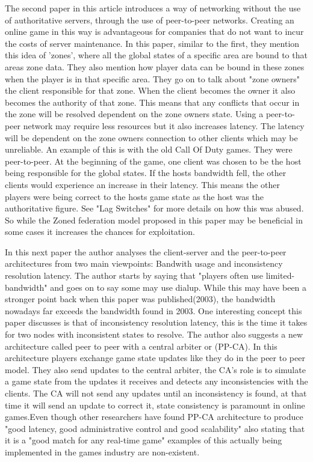 \documentclass{scrartcl}
\begin{document}
The second paper in this article introduces a way of networking without the use of authoritative servers, through the use of peer-to-peer networks\cite{iimura2004zoned}. Creating an online game in this way is advantageous for companies that do not want to incur the costs of server maintenance.  In this paper, similar to the first, they mention this idea of  'zones', where all the global states of a specific area are bound to that areas zone data. They also mention how player data can be bound in these zones when the player is in that specific area. They go on to talk about "zone owners" the client responsible for that zone. When the client becomes the owner it also becomes the authority of that zone. This means that any conflicts that occur in the zone will be resolved dependent on the zone owners state. Using a peer-to-peer network may require less resources but it also increases latency. The latency will be dependent on the zone owners connection to other clients which may be unreliable. An example of this is with the old Call Of Duty games. They were peer-to-peer. At the beginning of the game, one client was chosen to be the host being responsible for the global states. If the hosts bandwidth fell, the other clients would experience an increase in their latency. This means the other players were being correct to the hosts game state as the host was the authoritative figure. See "Lag Switches"\cite {LagSwitch} for more details on how this was abused. So while the Zoned federation model proposed in this paper may be beneficial in some cases it increases the chances for exploitation.

In this next paper\cite {pellegrino2003bandwidth} the author analyses the client-server and the peer-to-peer architectures from two main viewpoints: Bandwith usage and inconsistency  resolution latency. The author starts by saying that "players often use limited-bandwidth" and goes on to say some may use dialup. While this may have been a stronger point back when this paper was published(2003), the bandwidth nowadays far exceeds the bandwidth found in 2003. One interesting concept this paper discusses is that of inconsistency resolution latency, this is the time it takes for two nodes with inconsistent states to resolve. The author also suggests a new architecture called peer to peer with a central arbiter or (PP-CA). In this architecture players exchange game state updates like they do in the peer to peer model. They also send updates to the central arbiter, the CA's role is to simulate a game state from the updates it receives and detects any inconsistencies with the clients. The CA will not send any updates until an inconsistency is found, at that time it will send an update to correct it, state consistency is paramount in online games\cite {pantel2002impact}.Even though other researchers have found PP-CA architecture to produce "good latency, good administrative control and good scalability"\cite[p.22]{sutinrerk2006mirrored} also stating that it is a "good match for any real-time game"\cite[p.22]{sutinrerk2006mirrored} examples of this actually being implemented in the games industry are non-existent. 
\end{document}
